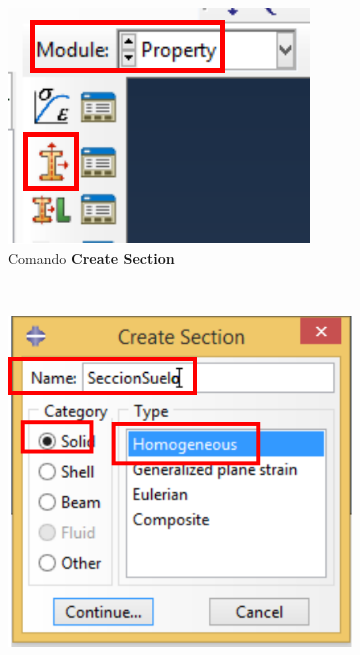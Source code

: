   \begin{figure}[!h]
    \centering
    \begin{subfigure}[!h]{0.20\textwidth}
      \includegraphics[width=\textwidth]{./body/images/prop03p.pdf}
      \caption{Comando \textbf{Create Section}}
      \label{prop03p}
    \end{subfigure}%
    ~
    \begin{subfigure}[!h]{0.39\textwidth}
      \includegraphics[width=\textwidth]{./body/images/prop04.pdf}

\end{subfigure}
\end{figure}
